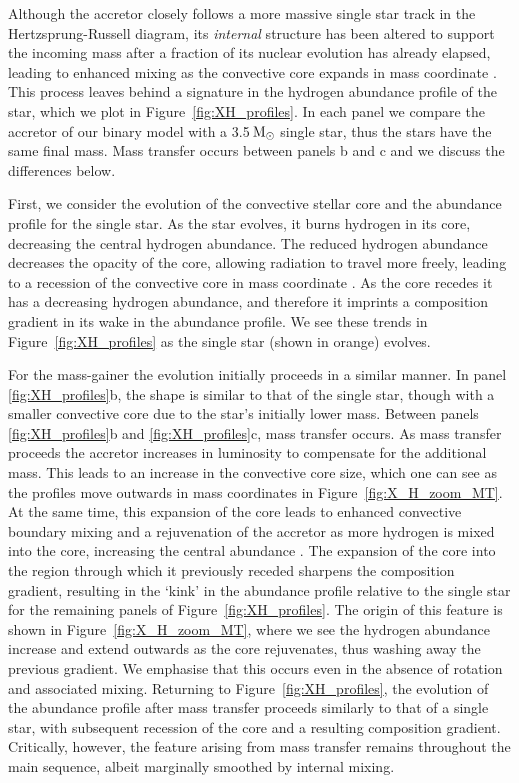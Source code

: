 \documentclass[desactivate]{aa}
\begin{document}
Although the accretor closely follows a more massive single star track in the Hertzsprung-Russell diagram, its \textit{internal} structure has been altered to support the incoming mass after a fraction of its nuclear evolution has already elapsed, leading to enhanced mixing as the convective core expands in mass coordinate \citep{Neo+1977, Hellings1983, Renzo+2023}. This process leaves behind a signature in the hydrogen abundance profile of the star, which we plot in Figure~\ref{fig:XH_profiles}. In each panel we compare the accretor of our binary model with a 3.5$\,{\rm M_\odot}$ single star, thus the stars have the same final mass. Mass transfer occurs between panels b and c and we discuss the differences below.

First, we consider the evolution of the convective stellar core and the abundance profile for the single star. As the star evolves, it burns hydrogen in its core, decreasing the central hydrogen abundance. The reduced hydrogen abundance decreases the opacity of the core, allowing radiation to travel more freely, leading to a recession of the convective core in mass coordinate \citep{Mitalas+1972,Crowe+1982,Miglio+2008,SilvaAguirre+2011, Xin+2022}. As the core recedes it has a decreasing hydrogen abundance, and therefore it imprints a composition gradient in its wake in the abundance profile. We see these trends in Figure~\ref{fig:XH_profiles} as the single star (shown in orange) evolves.

For the mass-gainer the evolution initially proceeds in a similar manner. In panel \ref{fig:XH_profiles}b, the shape is similar to that of the single star, though with a smaller convective core due to the star's initially lower mass. Between panels \ref{fig:XH_profiles}b and \ref{fig:XH_profiles}c, mass transfer occurs. As mass transfer proceeds the accretor increases in luminosity to compensate for the additional mass. This leads to an increase in the convective core size, which one can see as the profiles move outwards in mass coordinates in Figure~\ref{fig:X_H_zoom_MT}. At the same time, this expansion of the core leads to enhanced convective boundary mixing and a rejuvenation of the accretor as more hydrogen is mixed into the core, increasing the central abundance \citep{Neo+1977}. The expansion of the core into the region through which it previously receded sharpens the composition gradient, resulting in the `kink' in the abundance profile relative to the single star for the remaining panels of Figure~\ref{fig:XH_profiles}. The origin of this feature is shown in Figure~\ref{fig:X_H_zoom_MT}, where we see the hydrogen abundance increase and extend outwards as the core rejuvenates, thus washing away the previous gradient. We emphasise that this occurs even in the absence of rotation and associated mixing. Returning to Figure~\ref{fig:XH_profiles}, the evolution of the abundance profile after mass transfer proceeds similarly to that of a single star, with subsequent recession of the core and a resulting composition gradient. Critically, however, the feature arising from mass transfer remains throughout the main sequence, albeit marginally smoothed by internal mixing.
\end{document}
